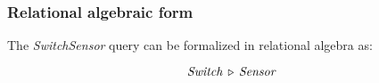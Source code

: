 
\subsubsection{Relational algebraic form} The \textit{SwitchSensor} query can be formalized in relational algebra as:

$$ \mathit{Switch} \, \triangleright \, \mathit{Sensor} $$
